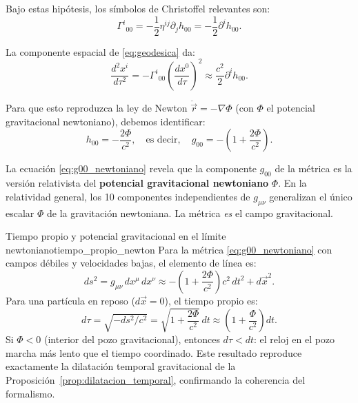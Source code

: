 Bajo estas hipótesis, los símbolos de Christoffel relevantes son:
\begin{equation}
  \Gamma^i{}_{00} = -\frac{1}{2}\eta^{ij}\partial_j h_{00} = -\frac{1}{2}\partial^i h_{00}.
  \label{eq:Gamma_i00}
\end{equation}

La componente espacial de \eqref{eq:geodesica} da:
\begin{equation}
  \frac{d^2 x^i}{d\tau^2} = -\Gamma^i{}_{00}\left(\frac{dx^0}{d\tau}\right)^2
  \approx \frac{c^2}{2}\partial^i h_{00}.
  \label{eq:geodesica_newtoniana}
\end{equation}

Para que esto reproduzca la ley de Newton $\ddot{\vec{r}} = -\nabla\Phi$ (con $\Phi$ el potencial gravitacional newtoniano), debemos identificar:
\begin{equation}
  \boxed{h_{00} = -\frac{2\Phi}{c^2}}, \quad \text{es decir}, \quad
  g_{00} = -\left(1 + \frac{2\Phi}{c^2}\right).
  \label{eq:g00_newtoniano}
\end{equation}

\begin{importante}
La ecuación \eqref{eq:g00_newtoniano} revela que la componente $g_{00}$ de la métrica es la versión relativista del \textbf{potencial gravitacional newtoniano} $\Phi$. En la relatividad general, los 10 componentes independientes de $g_{\mu\nu}$ generalizan el único escalar $\Phi$ de la gravitación newtoniana. La métrica \emph{es} el campo gravitacional.
\end{importante}

\begin{ejemplo}{Tiempo propio y potencial gravitacional en el límite newtoniano}{tiempo_propio_newton}
Para la métrica \eqref{eq:g00_newtoniano} con campos débiles y velocidades bajas, el elemento de línea es:
\[
  ds^2 = g_{\mu\nu}\,dx^\mu\,dx^\nu
  \approx -\left(1 + \frac{2\Phi}{c^2}\right)c^2\,dt^2 + d\vec{x}^2.
\]
Para una partícula en reposo ($d\vec{x} = 0$), el tiempo propio es:
\[
  d\tau = \sqrt{-ds^2/c^2} = \sqrt{1 + \frac{2\Phi}{c^2}}\,dt
  \approx \left(1 + \frac{\Phi}{c^2}\right)dt.
\]
Si $\Phi < 0$ (interior del pozo gravitacional), entonces $d\tau < dt$: el reloj en el pozo marcha más lento que el tiempo coordinado. Este resultado reproduce exactamente la dilatación temporal gravitacional de la Proposición~\ref{prop:dilatacion_temporal}, confirmando la coherencia del formalismo.
\end{ejemplo}

